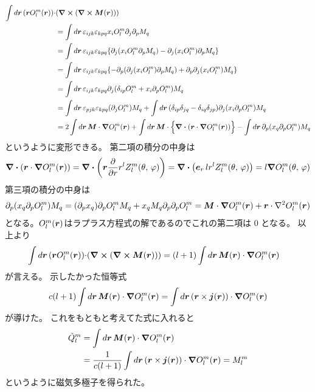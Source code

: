 \documentclass[../../master.tex]{subfiles}
\begin{document}
\begin{equation}\begin{aligned}[b]
    \int d\vb*{r}\, (\vb*{r}O_l^m(\vb*{r}))\cdot&(\curl (\curl\vb*{M}(\vb*{r}))) \notag\\
    &=\int d\vb*{r}\, \varepsilon_{ijk}\varepsilon_{kpq} x_i O_l^m \partial_j \partial_p M_q\\
    &=\int d\vb*{r}\, \varepsilon_{ijk}\varepsilon_{kpq}
    \qty{\partial_j(x_i O_l^m \partial_p M_q)-\partial_j(x_i O_l^m)\partial_p M_q}\\
    &=\int d\vb*{r}\, \varepsilon_{ijk}\varepsilon_{kpq}
    \qty{-\partial_p(\partial_j(x_i O_l^m)\partial_p M_q)+ \partial_p\partial_j(x_iO_l^m)M_q}\\
    &=\int d\vb*{r}\, \varepsilon_{ijk}\varepsilon_{kpq}
    \partial_j(\delta_{ip}O_l^m + x_i\partial_pO_l^m)M_q\\
    &=\int d\vb*{r}\, \varepsilon_{pjk}\varepsilon_{kpq} (\partial_j O_l^m)M_q
    +\int d\vb*{r}\, (\delta_{ip}\delta_{jq}-\delta_{iq}\delta_{jp})\partial_j(x_i\partial_p O_l^m)M_q\\
    &=2\int d\vb*{r}\, \vb*{M}\cdot\grad O_l^m(\vb*{r})
    + \int d\vb*{r}\, \vb*{M} \cdot \Bigl\{\div(\vb*{r}\cdot \grad O_l^m(\vb*{r}))\Bigr\}
    -\int d\vb*{r}\, \partial_p(x_q\partial_p O_l^m) M_q
\end{aligned}\end{equation}
というように変形できる。
第二項の積分の中身は
\begin{align}
    \div(\vb*{r}\cdot \grad O_l^m(\vb*{r}))
    = \div(\vb*{r}\pdv{r} r^l Z_l^m(\theta,\,\varphi))
    = \div(\vb*{e}_r \, lr^{l} Z_l^m(\theta,\,\varphi))
    = l\grad O_l^m(\theta,\,\varphi)
\end{align}
第三項の積分の中身は
\begin{align}
    \partial_p(x_q\partial_p O_l^m) M_q
    = (\partial_p x_q) \partial_p O_l^m M_q + x_q M_q \partial_p \partial_p O_l^m
    = \vb*{M} \cdot \grad O_l^m(\vb*{r}) + \vb*{r}\cdot \laplacian O_l^m(\vb*{r})
\end{align}
となる。\(O_l^m(\vb*{r})\)はラプラス方程式の解であるのでこれの第二項は 0 となる。
以上より
\begin{align}
    \int d\vb*{r}\, (\vb*{r}O_l^m(\vb*{r}))\cdot&(\curl (\curl\vb*{M}(\vb*{r})))
    = (l+1)\int d\vb*{r}\, \vb*{M}(\vb*{r})\cdot\grad O_l^m(\vb*{r})
\end{align}
が言える。
示したかった恒等式
\begin{equation}
    c(l+1)\int d\vb*{r}\, \vb*{M}(\vb*{r})\cdot\grad O_l^m(\vb*{r})
    =\int d\vb*{r}\, (\vb*{r}\times\vb*{j}(\vb*{r}))\cdot \grad O_l^m(\vb*{r})
\end{equation}
が導けた。
これをもともと考えてた式に入れると
\begin{equation}\begin{aligned}[b]
    \tilde{Q}_l^m &= \int d\vb*{r}\, \vb*{M}(\vb*{r}) \cdot \grad O_l^m(\vb*{r}) \\
    &=\frac{1}{c(l+1)}\int d\vb*{r}\,(\vb*{r}\times \vb*{j}(\vb*{r}))\cdot \grad O_l^m(\vb*{r}) = M_l^m
\end{aligned}\end{equation}
というように磁気多極子を得られた。
\end{document}
